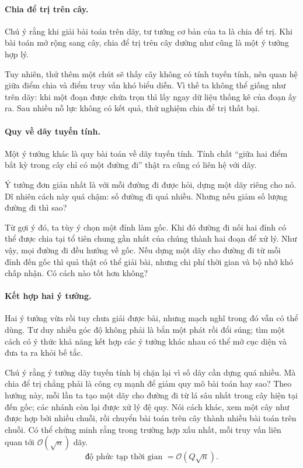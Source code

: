 \documentclass[11pt]{article}
\newcommand{\Oh}{\mathcal{O}}
\begin{document}
\paragraph{Chia để trị trên cây.}
Chú ý rằng khi giải bài toán trên dãy, tư tưởng cơ bản của ta là chia để trị.
Khi bài toán mở rộng sang cây, chia để trị trên cây dường như cũng là một ý
tưởng hợp lý.

Tuy nhiên, thử thêm một chút sẽ thấy cây không có tính tuyến tính, nên quan hệ
giữa điểm chia và điểm truy vấn khó biểu diễn. Vì thế ta không thể giống như
trên dãy: khi một đoạn được chứa trọn thì lấy ngay dữ liệu thống kê của đoạn
ấy ra. Sau nhiều nỗ lực không có kết quả, thử nghiệm chia để trị thất bại.

\paragraph{Quy về dãy tuyến tính.}
Một ý tưởng khác là quy bài toán về dãy tuyến tính. Tính chất ``giữa hai điểm
bất kỳ trong cây chỉ có một đường đi'' thật ra cũng có liên hệ với dãy.

Ý tưởng đơn giản nhất là với mỗi đường đi được hỏi, dựng một dãy riêng cho nó.
Dĩ nhiên cách này quá chậm: số đường đi quá nhiều. Nhưng nếu giảm số lượng
đường đi thì sao?

Từ gợi ý đó, ta tùy ý chọn một đỉnh làm gốc. Khi đó đường đi nối hai đỉnh có
thể được chia tại tổ tiên chung gần nhất của chúng thành hai đoạn để xử lý.
Như vậy, mọi đường đi đều hướng về gốc. Nếu dựng một dãy cho đường đi từ mỗi
đỉnh đến gốc thì quả thật có thể giải bài, nhưng chi phí thời gian và bộ nhớ
khó chấp nhận. Có cách nào tốt hơn không?

\paragraph{Kết hợp hai ý tưởng.}
Hai ý tưởng vừa rồi tuy chưa giải được bài, nhưng mạch nghĩ trong đó vẫn có
thể dùng. Tư duy nhiều góc độ không phải là bắn một phát rồi đổi súng; tìm một
cách có ý thức khả năng kết hợp các ý tưởng khác nhau có thể mở cục diện và
đưa ta ra khỏi bế tắc.

Chú ý rằng ý tưởng dãy tuyến tính bị chặn lại vì số dãy cần dựng quá nhiều.
Mà chia để trị chẳng phải là công cụ mạnh để giảm quy mô bài toán hay sao?
Theo hướng này, mỗi lần ta tạo một dãy cho đường đi từ lá sâu nhất trong cây
hiện tại đến gốc; các nhánh còn lại được xử lý đệ quy. Nói cách khác, xem một
cây như được hợp bởi nhiều chuỗi, rồi chuyển bài toán trên cây thành nhiều
bài toán trên chuỗi. Có thể chứng minh rằng trong trường hợp xấu nhất, mỗi
truy vấn liên quan tới \(\Oh(\sqrt n)\) dãy.
\[
  \text{độ phức tạp thời gian }=\Oh(Q\sqrt n).
\]
\end{document}
